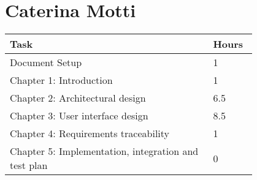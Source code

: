 \section{Caterina Motti}
\begin{center}
	\begin{tabular}{@{}p{0.7\linewidth} p{0.1\linewidth}@{}}
		\hline
		\textbf{Task} & \textbf{Hours} \\ \hline
            Document Setup & 1 \\ \hline
            Chapter 1: Introduction & 1 \\ \hline
            Chapter 2: Architectural design & 6.5 \\ \hline
            Chapter 3: User interface design & 8.5 \\ \hline
            Chapter 4: Requirements traceability & 1 \\ \hline
            Chapter 5: Implementation, integration and test plan & 0 \\ \hline
	\end{tabular}
\end{center}
